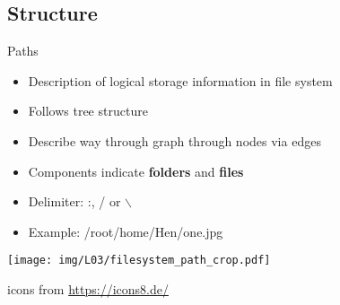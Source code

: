 \documentclass[hyperref={pdfpagelabels=false},aspectratio=169]{beamer}
\begin{document}
\subsection*{Structure}
\begin{frame}{Paths}
    \begin{minipage}{0.59\textwidth}

        \begin{itemize}
            \item Description of logical storage information in file system
            \item Follows tree structure
            \item Describe way through graph through nodes via edges
            \item Components indicate \textbf{folders} and \textbf{files}
            \item Delimiter: \textcolor{THorange}{:}, \textcolor{THorange}{/} or \textcolor{THorange}{$\backslash$}
            \item Example:
            /\textcolor{THviolett}{root}/\textcolor{THrot}{home}/\textcolor{THorange}{Hen}/\textcolor{THviolett}{one.jpg}
        \end{itemize}
    \end{minipage}
    \begin{minipage}{0.4\textwidth}
        \centering
        \texttt{[image: img/L03/filesystem\_path\_crop.pdf]}
        
        \tiny
        icons from \url{https://icons8.de/}
    \end{minipage}
\end{frame}
\end{document}
